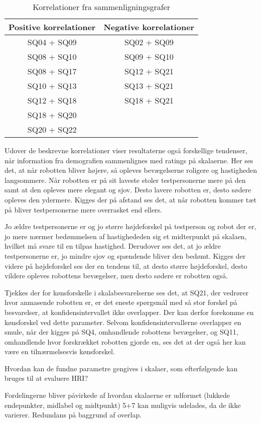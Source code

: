 \noindent
%
\begin{table}[H]
	\centering
	\begin{tabular}{ c|c }
		\centering
		Positive korrelationer & Negative korrelationer \\ \hline
		SQ04 + SQ09 & SQ02 + SQ09 \\ 
		SQ08 + SQ10 & SQ09 + SQ10 \\ 
		SQ08 + SQ17 & SQ12 + SQ21 \\ 
		SQ10 + SQ13 & SQ13 + SQ21 \\ 
		SQ12 + SQ18 & SQ18 + SQ21	\\	
		SQ18 + SQ20 & 							\\
		SQ20 + SQ22 & 
	\end{tabular}        
\caption{Korrelationer fra sammenligningsgrafer}
\label{tab:CorrelationsFromGraphs} 
\end{table}
\noindent
%
Udover de beskrevne korrelationer viser resultaterne også forskellige tendenser, når information fra demografien sammenlignes med ratings på skalaerne. Her ses det, at når robotten bliver højere, så opleves bevægelserne roligere og hastigheden langsommere. Når robotten er på sit laveste stoler testpersonerne mere på den samt at den opleves mere elegant og sjov. Desto lavere robotten er, desto sødere opleves den ydermere. Kigges der på afstand ses det, at når robotten kommer tæt på bliver testpersonerne mere overrasket end ellers. 

Jo ældre testpersonerne er og jo større højdeforskel på testperson og robot der er, jo mere nærmer bedømmelsen af hastighededen sig et midterpunkt på skalaen, hvilket må svare til en tilpas hastighed. Derudover ses det, at jo ældre testpersonerne er, jo mindre sjov og spændende bliver den bedømt. Kigges der videre på højdeforskel ses der en tendens til, at desto større højdeforskel, desto vildere opleves robottens bevægelser, men desto sødere er robotten også.

Tjekkes der for kønsforskelle i skalabesvarelserne ses det, at SQ21, der vedrører hvor anmasende robotten er, er det eneste spørgsmål med så stor forskel på besvarelser, at konfidensintervallet ikke overlapper. Der kan derfor forekomme en kønsforskel ved dette parameter. Selvom konfidensintervallerne overlapper en smule, når der kigges på SQ4, omhandlende robottens bevægelser, og SQ11, omhandlende hvor forskrækket robotten gjorde en, ses det at der også her kan være en tilnærmelsesvis kønsforskel.

 
Hvordan kan de fundne parametre gengives i skalaer, som efterfølgende kan bruges til at evaluere HRI?

Fordelingerne bliver påvirkede af hvordan skalaerne er udformet (lukkede endepunkter, midlabel og midtpunkt)
5+7 kan muligvis udelades, da de ikke varierer.
Redundans på baggrund af overlap.
